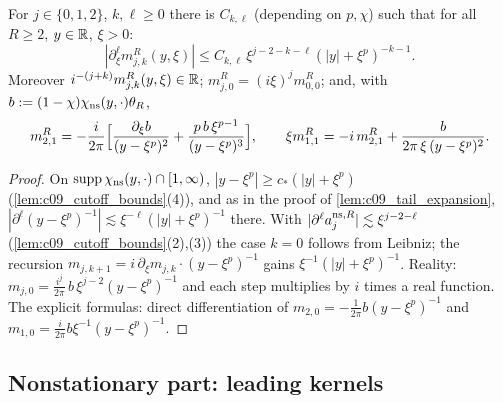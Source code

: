 \begin{lemma}
  \label{lem:c09_mjk_bounds}
  For $j\in\{0,1,2\}$, $k,\ell\ge0$ there is $C_{k,\ell}$ (depending on $p,\chi$) such that for all $R\ge2$, $y\in\mathbb{R}$, $\xi>0$:
  \[
    |\partial_\xi^\ell m_{j,k}^R(y,\xi)|\le C_{k,\ell}\,\xi^{j-2-k-\ell}(|y|+\xi^p)^{-k-1}.
  \]
  Moreover $i^{-(j+k)}m_{j,k}^R(y,\xi)\in\mathbb{R}$; $m^R_{j,0}=(i\xi)^jm^R_{0,0}$; and, with $b:=(1-\chi)\chi_{\textup{ns}}(y,\cdot)\theta_R$,
  \[
    m_{2,1}^R=-\frac{i}{2\pi}\Bigl[\frac{\partial_\xi b}{(y-\xi^p)^2}+\frac{p\,b\,\xi^{p-1}}{(y-\xi^p)^3}\Bigr],\qquad
    \xi m_{1,1}^R=-i\,m_{2,1}^R+\frac{b}{2\pi\,\xi\,(y-\xi^p)^2}.
  \]
\end{lemma}
\begin{proof}
  On $\operatorname{supp}\chi_{\textup{ns}}(y,\cdot)\cap[1,\infty)$, $|y-\xi^p|\ge c_*(|y|+\xi^p)$ (\cref{lem:c09_cutoff_bounds}(4)), and as in the proof of
  \cref{lem:c09_tail_expansion}, $|\partial^\ell(y-\xi^p)^{-1}|\lesssim\xi^{-\ell}(|y|+\xi^p)^{-1}$ there. With $|\partial^\ell a_j^{\textup{ns},R}|\lesssim\xi^{j-2-\ell}$
  (\cref{lem:c09_cutoff_bounds}(2),(3)) the case $k=0$ follows from Leibniz; the recursion $m_{j,k+1}=i\,\partial_\xi m_{j,k}\cdot(y-\xi^p)^{-1}$ gains
  $\xi^{-1}(|y|+\xi^p)^{-1}$. Reality: $m_{j,0}=\frac{i^j}{2\pi}\,b\,\xi^{j-2}(y-\xi^p)^{-1}$ and each step multiplies by $i$ times a real function.
  The explicit formulas: direct differentiation of $m_{2,0}=-\frac1{2\pi}b(y-\xi^p)^{-1}$ and $m_{1,0}=\frac{i}{2\pi}b\xi^{-1}(y-\xi^p)^{-1}$.
\end{proof}

\subsection{Nonstationary part: leading kernels}

